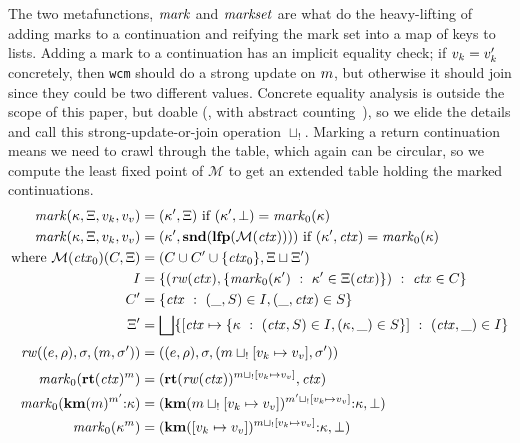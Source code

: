 {The two metafunctions, $\mathit{mark}$ and $\mathit{markset}$ are what do the heavy-lifting of adding marks to a continuation and reifying the mark set into a map of keys to lists.
%
Adding a mark to a continuation has an implicit equality check; if $v_k = v_k'$ concretely, then {\tt wcm} should do a strong update on $m$, but otherwise it should join since they could be two different values.
%
Concrete equality analysis is outside the scope of this paper, but doable (\eg, with abstract counting~\citep{dvanhorn:Might:2006:GammaCFA}), so we elide the details and call this strong-update-or-join operation $\sqcup_{!{}}$.
%
Marking a return continuation means we need to crawl through the table, which again can be circular, so we compute the least fixed point of ${\mathcal M}$ to get an extended table holding the marked continuations.
%
\newcommand{\rewritectx}{\mathit{rw}}
\newcommand{\domarkstep}{\mathit{mark}_0}
\begin{align*}
  \domark(\mkont, \mktab, \mval_k, \mval_v) &= (\mkont', \mktab) \text{ if } (\mkont',\bot) = \domarkstep(\mkont) \\
  \domark(\mkont, \mktab, \mval_k, \mval_v) &= (\mkont', \mathbf{snd}(\lfp({\mathcal M}(\mctx)))) \text{ if } (\mkont',\mctx) = \domarkstep(\mkont) \\
  \text{where } {\mathcal M}(\mctx_0)(C, \mktab) &= (C \cup C' \cup \set{\mctx_0}, \mktab \sqcup \mktab') \\
    I &= \setbuild{(\rewritectx(\mctx), \setbuild{\domarkstep(\mkont')}{\mkont' \in \mktab(\mctx)})}{\mctx \in C} \\
    C' &= \setbuild{\mctx}{(\_, S) \in I, (\_, \mctx) \in S} \\
    \mktab' &= \bigsqcup\setbuild{[\mctx \mapsto \setbuild{\mkont}{(\mctx, S) \in I, (\mkont, \_) \in S}]}{(\mctx,\_) \in I}
\\[2pt]
  \rewritectx((\mexpr,\menv),\mstore,(\mmarks, \mstore')) &= ((\mexpr,\menv),\mstore,(\mmarks\sqcup_{!{}}[\mval_k \mapsto \mval_v], \mstore'))
\\[2pt]
  \domarkstep(\krt{\mctx}^\mmarks) &= (\krt{\rewritectx(\mctx)}^{\mmarks \sqcup_{!{}} [\mval_k \mapsto \mval_v]}, \mctx) \\
  \domarkstep(\kcons{\kwcm{\mmarks}^{\mmarks'}}{\mkont}) &= (\kcons{\kwcm{\mmarks \sqcup_{!{}} [\mval_k \mapsto \mval_v]}^{\mmarks' \sqcup_{!{}} [\mval_k \mapsto \mval_v]}}{\mkont}, \bot) \\
  \domarkstep(\mkont^\mmarks) &= (\kcons{\kwcm{[\mval_k \mapsto \mval_v]}^{\mmarks \sqcup_{!{}} [\mval_k \mapsto \mval_v]}}{\mkont}, \bot)
\end{align*}

}

